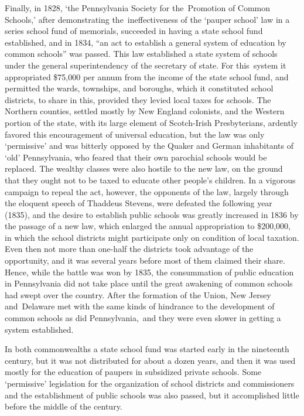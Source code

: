 \documentclass[
]{book}
\begin{document}
Finally, in 1828, `the Pennsylvania Society for the~Promotion of Common Schools,' after demonstrating the~ineffectiveness of the `pauper school' law in a series school fund of memorials, succeeded in having a state school fund established, and in 1834, ``an act to establish a general system of education by common schools'' was passed. This law established a state system of schools under the general superintendency of the secretary of state. For this~system it appropriated \$75,000 per annum from the income of the state school fund, and permitted the wards, townships, and boroughs, which it constituted school districts, to share in this, provided they levied local taxes for schools. The Northern counties, settled mostly by New England colonists, and the Western portion of the state, with its large element of Scotch-Irish Presbyterians, ardently favored this encouragement of universal education, but the law was only `permissive' and was bitterly opposed by the Quaker and German inhabitants of `old' Pennsylvania, who feared that their own parochial schools would be replaced. The wealthy classes were also hostile to the new law, on the ground that they ought not to be taxed to educate other people's children. In a vigorous campaign to repeal the act, however, the opponents of the law, largely through the eloquent speech of Thaddeus Stevens, were defeated the following year (1835), and the desire to establish public schools was greatly increased in 1836 by the passage of a new law, which enlarged the annual appropriation to \$200,000, in which the school districts might participate only on condition of local taxation. Even then not more than one-half the districts took advantage of the opportunity, and it was several years before most of them claimed their share. Hence, while the battle was won by 1835, the consummation of public education in Pennsylvania did not take place until the great awakening of common schools had swept over the country. After the formation of the Union, New Jersey and~Delaware met with the same kinds of hindrance to the development of common schools as did Pennsylvania,~and they were even slower in getting a system established.

In both commonwealths a state school fund was started early in the nineteenth century, but it was not distributed for about a dozen years, and then it was used mostly for the education of paupers in subsidized private schools. Some `permissive' legislation for the organization of school districts and commissioners and the establishment of public schools was also passed, but it accomplished little before the middle of the century.
\end{document}
